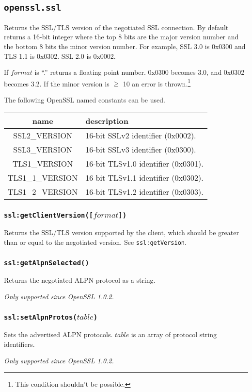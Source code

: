 \documentclass[11pt, oneside]{memoir}
\newcommand*{\fn}[1]{\texttt{#1}\xspace}
\newcounter{toccols}
\newenvironment{Module}[1]{
	\subsection{\texttt{#1}}
	\addtocontents{toc}{
		\protect\begin{multicols}{\value{toccols}}
	}
}{
	\addtocontents{toc}{\protect\end{multicols}}
}
\begin{document}
\begin{Module}{openssl.ssl}
Returns the SSL/TLS version of the negotiated SSL connection. By default returns a 16-bit integer where the top 8 bits are the major version number and the bottom 8 bits the minor version number. For example, SSL 3.0 is 0x0300 and TLS 1.1 is 0x0302. SSL 2.0 is 0x0002.

If $format$ is ``.'' returns a floating point number. 0x0300 becomes 3.0, and 0x0302 becomes 3.2. If the minor version is $\geq$ 10 an error is thrown.\footnote{This condition shouldn't be possible.}

The following OpenSSL named constants can be used.

\begin{tabular}{ c | l }
name & description \\\hline
SSL2\_VERSION & 16-bit SSLv2 identifier (0x0002).  \\
SSL3\_VERSION & 16-bit SSLv3 identifier (0x0300).  \\
TLS1\_VERSION & 16-bit TLSv1.0 identifier (0x0301).  \\
TLS1\_1\_VERSION & 16-bit TLSv1.1 identifier (0x0302).  \\
TLS1\_2\_VERSION & 16-bit TLSv1.2 identifier (0x0303).  \\
\end{tabular}

\subsubsection[\fn{ssl:getClientVersion}]{\fn{ssl:getClientVersion([$format$])}}

Returns the SSL/TLS version supported by the client, which should be greater than or equal to the negotiated version. See \fn{ssl:getVersion}.

\subsubsection[\fn{ssl:getAlpnSelected}]{\fn{ssl:getAlpnSelected()}}

Returns the negotiated ALPN protocol as a string.

\emph{Only supported since OpenSSL 1.0.2.}

\subsubsection[\fn{ssl:setAlpnProtos}]{\fn{ssl:setAlpnProtos($table$)}}

Sets the advertised ALPN protocols. $table$ is an array of protocol string identifiers.

\emph{Only supported since OpenSSL 1.0.2.}

\end{Module}
\end{document}
